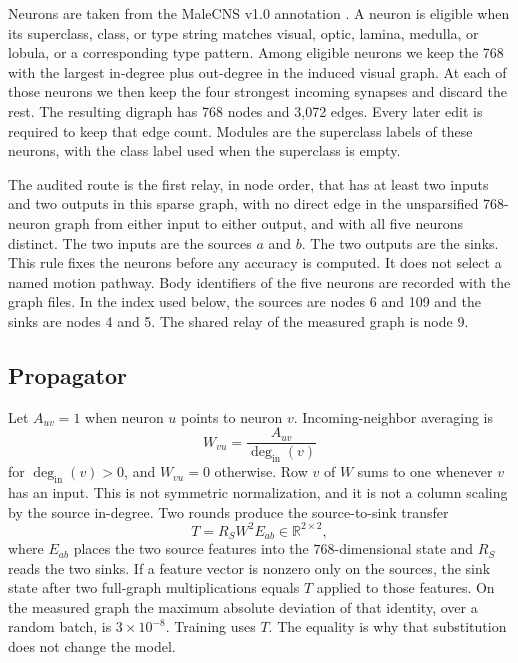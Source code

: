 \documentclass[10pt,twocolumn,letterpaper]{article}
\begin{document}
Neurons are taken from the MaleCNS v1.0 annotation \cite{berg2026}.
A neuron is eligible when its superclass, class, or type string matches visual, optic, lamina, medulla, or lobula, or a corresponding type pattern.
Among eligible neurons we keep the 768 with the largest in-degree plus out-degree in the induced visual graph.
At each of those neurons we then keep the four strongest incoming synapses and discard the rest.
The resulting digraph has 768 nodes and 3,072 edges.
Every later edit is required to keep that edge count.
Modules are the superclass labels of these neurons, with the class label used when the superclass is empty.

The audited route is the first relay, in node order, that has at least two inputs and two outputs in this sparse graph, with no direct edge in the unsparsified 768-neuron graph from either input to either output, and with all five neurons distinct.
The two inputs are the sources $a$ and $b$.
The two outputs are the sinks.
This rule fixes the neurons before any accuracy is computed.
It does not select a named motion pathway.
Body identifiers of the five neurons are recorded with the graph files.
In the index used below, the sources are nodes 6 and 109 and the sinks are nodes 4 and 5.
The shared relay of the measured graph is node 9.

\subsection{Propagator}
\label{sec:propagator}

Let $A_{uv}=1$ when neuron $u$ points to neuron $v$.
Incoming-neighbor averaging is
\begin{equation}
W_{vu} = \frac{A_{uv}}{\deg_{\mathrm{in}}(v)}
\label{eq:W}
\end{equation}
for $\deg_{\mathrm{in}}(v)>0$, and $W_{vu}=0$ otherwise.
Row $v$ of $W$ sums to one whenever $v$ has an input.
This is not symmetric normalization, and it is not a column scaling by the source in-degree.
Two rounds produce the source-to-sink transfer
\begin{equation}
T = R_S W^2 E_{ab} \in \mathbb{R}^{2\times 2},
\label{eq:T}
\end{equation}
where $E_{ab}$ places the two source features into the $768$-dimensional state and $R_S$ reads the two sinks.
If a feature vector is nonzero only on the sources, the sink state after two full-graph multiplications equals $T$ applied to those features.
On the measured graph the maximum absolute deviation of that identity, over a random batch, is $3\times 10^{-8}$.
Training uses $T$.
The equality is why that substitution does not change the model.
\end{document}
